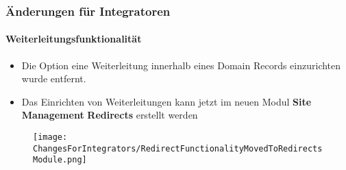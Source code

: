 
\begin{frame}[fragile]
	\frametitle{Änderungen für Integratoren}
	\framesubtitle{Weiterleitungsfunktionalität}

	\begin{itemize}
		\item Die Option eine Weiterleitung innerhalb eines Domain Records einzurichten wurde entfernt.
		\item Das Einrichten von Weiterleitungen kann jetzt im neuen Modul \newline
			\textbf{Site Management} \textrightarrow \textbf{Redirects} erstellt werden
	\end{itemize}

	\begin{figure}
		\texttt{[image: ChangesForIntegrators/RedirectFunctionalityMovedToRedirectsModule.png]}
	\end{figure}

\end{frame}

